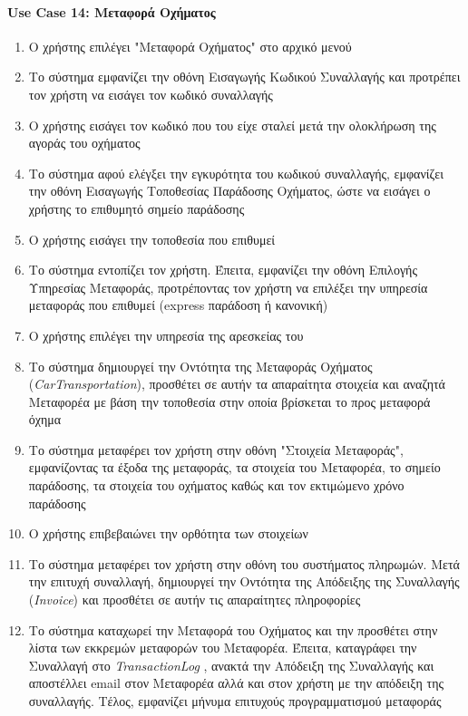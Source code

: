 \documentclass{../ol-softwaremanual}
\begin{document}
	\paragraph{\en Use Case 14: \gr Μεταφορά Οχήματος}  
		\begin{enumerate}
		\item Ο χρήστης επιλέγει \en"\gr Μεταφορά Οχήματος\en" \gr στο αρχικό μενού
		\item Το σύστημα εμφανίζει την οθόνη Εισαγωγής Κωδικού Συναλλαγής και προτρέπει τον χρήστη να εισάγει τον κωδικό συναλλαγής
		\item Ο χρήστης εισάγει τον κωδικό που του είχε σταλεί μετά την ολοκλήρωση της αγοράς του οχήματος
		\item Το σύστημα αφού ελέγξει την εγκυρότητα του κωδικού συναλλαγής, εμφανίζει την οθόνη Εισαγωγής Τοποθεσίας Παράδοσης Οχήματος, ώστε να εισάγει ο χρήστης το επιθυμητό σημείο παράδοσης
		\item Ο χρήστης εισάγει την τοποθεσία που επιθυμεί
		\item Το σύστημα εντοπίζει τον χρήστη. Έπειτα, εμφανίζει την οθόνη Επιλογής Υπηρεσίας Μεταφοράς, προτρέποντας τον χρήστη να επιλέξει την υπηρεσία μεταφοράς που επιθυμεί (\en express \gr παράδοση ή κανονική)		
		\item Ο χρήστης επιλέγει την υπηρεσία της αρεσκείας του
		\item Το σύστημα δημιουργεί την Οντότητα της Μεταφοράς Οχήματος (\en\textit{CarTransportation}\gr), προσθέτει σε αυτήν τα απαραίτητα στοιχεία και αναζητά Μεταφορέα με βάση την τοποθεσία στην οποία βρίσκεται το προς μεταφορά όχημα
		\item Το σύστημα μεταφέρει τον χρήστη στην οθόνη \en"\gr Στοιχεία Μεταφοράς\en"\gr, εμφανίζοντας τα έξοδα της μεταφοράς, τα στοιχεία του Μεταφορέα, το σημείο παράδοσης, τα στοιχεία του οχήματος καθώς και τον εκτιμώμενο χρόνο παράδοσης 
		\item Ο χρήστης επιβεβαιώνει την ορθότητα των στοιχείων 		
		\item Το σύστημα μεταφέρει τον χρήστη στην οθόνη του συστήματος πληρωμών. Μετά την επιτυχή συναλλαγή, δημιουργεί την Οντότητα της Απόδειξης της Συναλλαγής (\en \textit{Invoice}\gr) και προσθέτει σε αυτήν τις απαραίτητες πληροφορίες  
		\item Το σύστημα καταχωρεί την Μεταφορά του Οχήματος και την προσθέτει στην λίστα των εκκρεμών μεταφορών του Μεταφορέα. Έπειτα, καταγράφει την Συναλλαγή στο \en \textit{TransactionLog} \gr, ανακτά την Απόδειξη της Συναλλαγής και αποστέλλει \en email \gr στον Μεταφορέα αλλά και στον χρήστη με την απόδειξη της συναλλαγής. Τέλος, εμφανίζει μήνυμα επιτυχούς προγραμματισμού μεταφοράς
	\end{enumerate}
	
\end{document}

